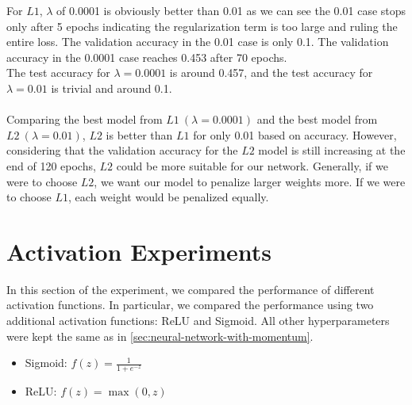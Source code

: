 \documentclass{article}
\begin{document}
    For $L1$, $\lambda$ of 0.0001 is obviously better than 0.01 as we can see the 0.01 case stops only after 5 epochs indicating the regularization term is too large and ruling the entire loss. The validation accuracy in the 0.01 case is only 0.1. The validation accuracy in the 0.0001 case reaches 0.453 after 70 epochs. \\
    The test accuracy for $\lambda=0.0001$ is around 0.457, and the test accuracy for $\lambda=0.01$ is trivial and around 0.1. \\
    \\
    Comparing the best model from $L1 \ (\lambda=0.0001)$ and the best model from $L2 \ (\lambda=0.01)$, $L2$ is better than $L1$ for only 0.01 based on accuracy. However, considering that the validation accuracy for the $L2$ model is still increasing at the end of 120 epochs, $L2$ could be more suitable for our network. Generally, if we were to choose $L2$, we want our model to penalize larger weights more. If we were to choose $L1$, each weight would be penalized equally.


    \section{Activation Experiments}\label{sec:activation-experiments}

    In this section of the experiment, we compared the performance of different activation functions.
    In particular, we compared the performance using two additional activation functions: ReLU and Sigmoid.
    All other hyperparameters were kept the same as in \ref{sec:neural-network-with-momentum}.

    \begin{itemize}
        \item Sigmoid: $f(z)=\frac{1}{1+e^{-z}}$
        \item ReLU: $f(z)=\max (0, z)$
    \end{itemize}
\end{document}

